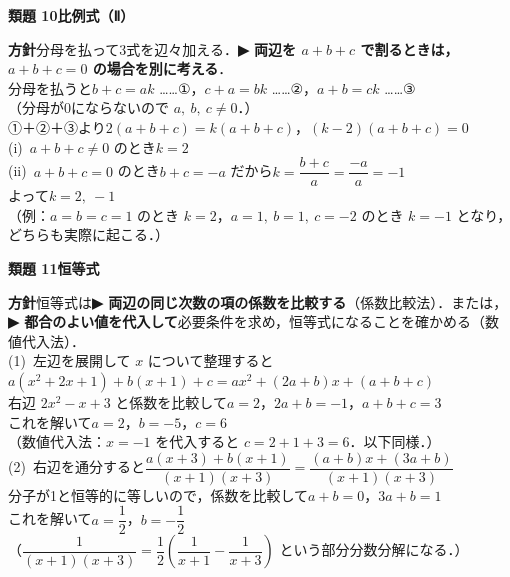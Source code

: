 \documentclass[a4paper,11pt]{ltjsarticle}
\newcommand{\ans}[2]{\Needspace{5\baselineskip}\vspace{6pt}%
  {\sffamily\bfseries 類題 #1\quad #2}\par}
\newcommand{\point}[1]{\textsf{\bfseries ▶ #1}}
\begin{document}
\ans{10}{比例式（Ⅱ）}
\begin{kai}
\textbf{方針}\quad 分母を払って3式を辺々加える．\point{両辺を $a+b+c$ で割るときは，$a+b+c=0$ の場合を別に考える}．\\[2pt]
分母を払うと\quad $b+c=ak$ ……①，\quad $c+a=bk$ ……②，\quad $a+b=ck$ ……③\\
（分母が0にならないので $a,\ b,\ c\neq0$．）\\
①＋②＋③より\quad $2(a+b+c)=k(a+b+c)$，\quad $(k-2)(a+b+c)=0$\\[2pt]
(i)\ $a+b+c\neq0$ のとき\quad $k=2$\\
(ii)\ $a+b+c=0$ のとき\quad $b+c=-a$ だから\quad $k=\dfrac{b+c}{a}=\dfrac{-a}{a}=-1$\\[2pt]
よって\quad $k=2,\ -1$\\
（例：$a=b=c=1$ のとき $k=2$，$a=1,\ b=1,\ c=-2$ のとき $k=-1$ となり，どちらも実際に起こる．）
\end{kai}

\ans{11}{恒等式}
\begin{kai}
\textbf{方針}\quad 恒等式は\point{両辺の同じ次数の項の係数を比較する}（係数比較法）．または，\point{都合のよい値を代入して}必要条件を求め，恒等式になることを確かめる（数値代入法）．\\[2pt]
(1)\ 左辺を展開して $x$ について整理すると\\
\hspace*{1.5em}$a(x^2+2x+1)+b(x+1)+c=ax^2+(2a+b)x+(a+b+c)$\\
\hspace*{1.5em}右辺 $2x^2-x+3$ と係数を比較して\quad $a=2$，\quad $2a+b=-1$，\quad $a+b+c=3$\\
\hspace*{1.5em}これを解いて\quad $a=2$，$b=-5$，$c=6$\\
\hspace*{1.5em}（数値代入法：$x=-1$ を代入すると $c=2+1+3=6$．以下同様．）\\[2pt]
(2)\ 右辺を通分すると\quad $\dfrac{a(x+3)+b(x+1)}{(x+1)(x+3)}=\dfrac{(a+b)x+(3a+b)}{(x+1)(x+3)}$\\
\hspace*{1.5em}分子が1と恒等的に等しいので，係数を比較して\quad $a+b=0$，\quad $3a+b=1$\\
\hspace*{1.5em}これを解いて\quad $a=\dfrac12$，$b=-\dfrac12$\\
\hspace*{1.5em}（$\dfrac{1}{(x+1)(x+3)}=\dfrac12\left(\dfrac1{x+1}-\dfrac1{x+3}\right)$ という部分分数分解になる．）
\end{kai}
\end{document}
